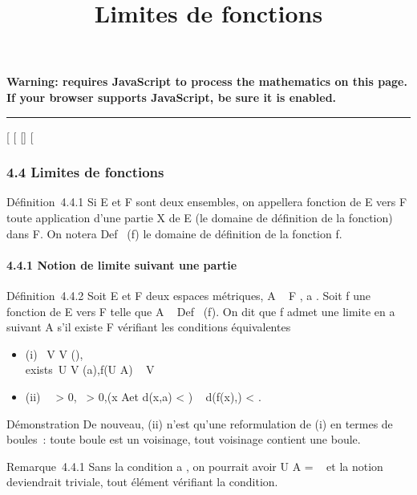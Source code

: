 \documentclass[]{article}
\title{Limites de fonctions}
\author{}
\date{}
\begin{document}
\maketitle

\textbf{Warning: 
requires JavaScript to process the mathematics on this page.\\ If your
browser supports JavaScript, be sure it is enabled.}

\begin{center}\rule{3in}{0.4pt}\end{center}

{[}
{[}
{[}{]}
{[}

\subsubsection{4.4 Limites de fonctions}

Définition~4.4.1 Si E et F sont deux ensembles, on appellera fonction de
E vers F toute application d'une partie X de E (le domaine de définition
de la fonction) dans F. On notera Def~ (f) le
domaine de définition de la fonction f.

\paragraph{4.4.1 Notion de limite suivant une partie}

Définition~4.4.2 Soit E et F deux espaces métriques, A \subset~ F , a
\in\overlineA. Soit f une fonction de E vers F telle
que A \subset~ Def~ (f). On dit que f admet une limite
en a suivant A s'il existe \ell \in F vérifiant les conditions équivalentes

\begin{itemize}
\itemsep1pt\parskip0pt
\item
  (i) \forall~V \in V (\ell), \\exists~U
  \in V (a),\quad f(U \bigcap A) \subset~ V
\item
  (ii) \forall~~\epsilon \textgreater{} 0,
  \exists~\eta \textgreater{} 0,\quad (x
  \in A\text et d(x,a) \textless{} \eta) \rigtharrow~ d(f(x),\ell)
  \textless{} \epsilon.
\end{itemize}

Démonstration De nouveau, (ii) n'est qu'une reformulation de (i) en
termes de boules~: toute boule est un voisinage, tout voisinage contient
une boule.

Remarque~4.4.1 Sans la condition a \in\overlineA, on
pourrait avoir U \bigcap A = \varnothing~ et la notion deviendrait triviale, tout élément
\ell vérifiant la condition.
\end{document}
